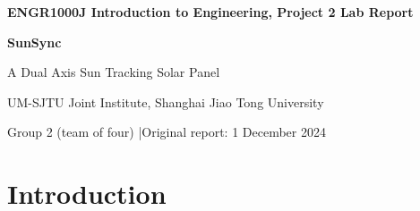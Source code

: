 \documentclass[11pt,a4paper]{article}
\begin{document}
\begin{center}
  {\Large\bfseries\color{accent} ENGR1000J Introduction to Engineering, Project 2 Lab Report\par}
  \vspace{0.8em}
  {\fontsize{24}{28}\selectfont\bfseries SunSync\par}
  \vspace{0.3em}
  {\Large A Dual Axis Sun Tracking Solar Panel\par}
  \vspace{1em}
  UM-SJTU Joint Institute, Shanghai Jiao Tong University\par
  Group 2 (team of four) \quad|\quad Original report: 1 December 2024
\end{center}

\vspace{0.5em}
\noindent{}

\vspace{1em}

\begin{abstract}
\noindent
We built a prototype sun tracking solar panel that follows a light source on two axes. Four light dependent resistors (LDRs) mounted around the panel measure how light is distributed across it, and an Arduino microcontroller drives two servo motors to move the panel toward the brighter side until the readings balance. In two flashlight trials the panel followed the moving light and the output stayed stable, and the firmware drives each axis over a range of \ang{180}. A simple idealised model, in which the tracker always faces the light and a fixed horizontal panel does not, predicts that tracking collects $\pi/2\approx1.57$ times as much energy over a day. This ratio is a theoretical estimate. The prototype's energy output was not compared against a fixed panel in a quantitative test.
\end{abstract}

\section{Introduction}
\end{document}
